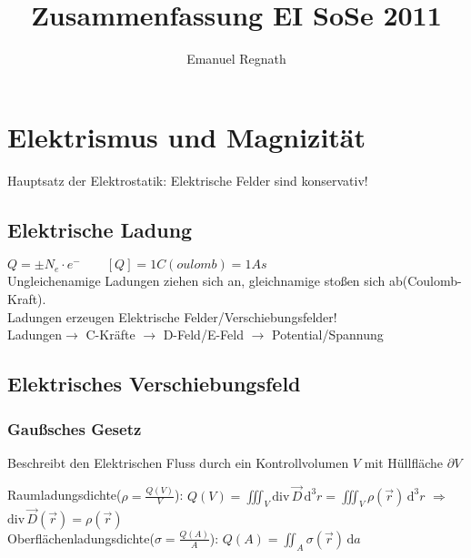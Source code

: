 \documentclass[10pt,a4paper]{scrartcl}
\title{Zusammenfassung EI SoSe 2011}
\author{Emanuel Regnath}
\begin{document}
\maketitle





\newpage

\section{Elektrismus und Magnizität}
Hauptsatz der Elektrostatik: Elektrische Felder sind konservativ!

\subsection{Elektrische Ladung}
$Q=\pm N_e\cdot e^{-} \qquad [Q]=1C(oulomb)=1As$\\
Ungleichenamige Ladungen ziehen sich an, gleichnamige stoßen sich ab(Coulomb-Kraft).\\
Ladungen erzeugen Elektrische Felder/Verschiebungsfelder!\\
Ladungen$\rightarrow$ C-Kräfte $\rightarrow$ D-Feld/E-Feld $\rightarrow$ Potential/Spannung




\subsection{Elektrisches Verschiebungsfeld}

\subsubsection{Gaußsches Gesetz} %
Beschreibt den Elektrischen Fluss durch ein Kontrollvolumen $V$ mit Hüllfläche $\partial V$
\begin{center}  \end{center}
Raumladungsdichte($\rho=\frac{Q(V)}{V}$):  $Q(V)=\iiint_{V} \mathrm{div} \, \vec D \, \mathrm d^3r = \iiint_{V} \rho(\vec r) \, \mathrm d^3r$ \quad $\Rightarrow$ \quad $\mathrm{div} \, \vec D(\vec r)=\rho(\vec r)$\\
Oberflächenladungsdichte($\sigma=\frac{Q(A)}{A}$):  $Q(A)=\iint_{A} \sigma(\vec r) \, \mathrm da$
\end{document}

